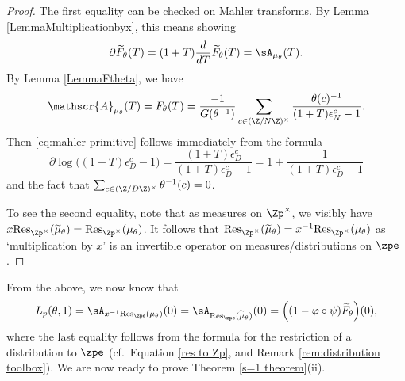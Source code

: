 \documentclass[a4paper,10pt, english, reqno]{smfart}
\numberwithin{equation}{section}
\begin{document}
\begin{proof}
The first equality can be checked on Mahler transforms. By Lemma \ref{LemmaMultiplicationbyx}, this means showing 
\begin{equation}\label{eq:mahler primitive}
\partial \widetilde{F}_\theta(T) = (1+T)\frac{d}{dT}\widetilde{F}_\theta(T) = \sA_{\mu_\theta}(T).
\end{equation}
By Lemma \ref{LemmaFtheta}, we have
\[\mathscr{A}_{\mu_\theta}(T) = F_\theta(T) = \frac{-1}{G(\theta^{-1})} \sum_{c\in(\Z/N\Z)^\times}\frac{\theta(c)^{-1}}{(1+T)\epsilon_{N}^c - 1}. \]
Then \eqref{eq:mahler primitive} follows immediately from the formula
\[ \partial \log \big( (1 + T) \epsilon_D^c - 1 \big) = \frac{(1 + T) \epsilon_D^c}{(1 + T) \epsilon_D^c - 1} = 1 + \frac{1}{(1 + T) \epsilon_D^c - 1} \] 
and the fact that $\sum_{c \in (\Z / D \Z)^\times} \theta^{-1}(c) = 0$.

To see the second equality, note that as measures on $\Zp^\times$, we visibly have $x\mathrm{Res}_{\Zp^\times}(\widetilde{\mu}_\theta) = \mathrm{Res}_{\Zp^\times}(\mu_\theta)$. It follows that $\mathrm{Res}_{\Zp^\times}(\widetilde{\mu}_\theta)  =x^{-1}\mathrm{Res}_{\Zp^\times}(\mu_\theta)$ as `multiplication by $x$' is an invertible operator on measures/distributions on $\zpe$.
\end{proof}


From the above, we now know that
\begin{equation}\label{eq:Lptheta 1,2}
L_p(\theta,1) = \sA_{x^{-1}\mathrm{Res}_{\zpe}(\mu_\theta)}(0) = \sA_{\mathrm{Res}_{\zpe}(\widetilde{\mu}_\theta)}(0) = \Big((1-\varphi\circ\psi)\widetilde{F}_\theta\Big)(0),
\end{equation}
where the last equality follows from the formula for the restriction of a distribution to $\zpe$ (cf.\ Equation \eqref{res to Zp}, and Remark \ref{rem:distribution toolbox}). We are now ready to prove Theorem \ref{s=1 theorem}(ii).
\end{document}
